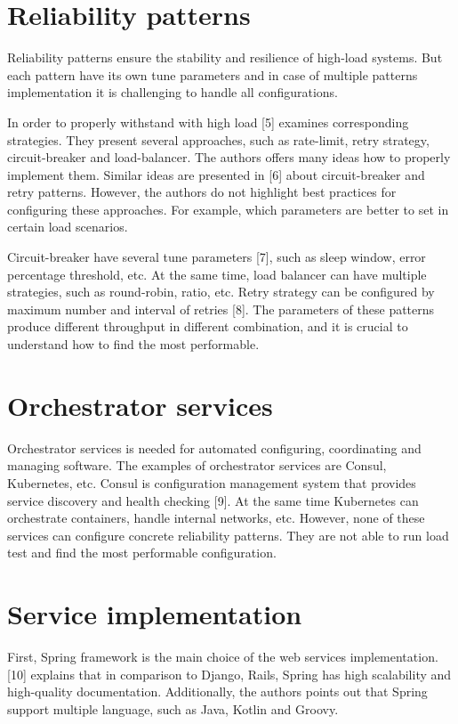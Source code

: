 \section{Reliability patterns}\label{sec:reliablity}

Reliability patterns ensure the stability and resilience of high-load systems.
But each pattern have its own tune parameters and in case of multiple patterns implementation it is challenging to handle all configurations.

In order to properly withstand with high load [5] examines corresponding strategies.
They present several approaches, such as rate-limit, retry strategy, circuit-breaker and load-balancer.
The authors offers many ideas how to properly implement them.
Similar ideas are presented in [6] about circuit-breaker and retry patterns.
However, the authors do not highlight best practices for configuring these approaches.
For example, which parameters are better to set in certain load scenarios.

Circuit-breaker have several tune parameters [7], such as sleep window, error percentage threshold, etc.
At the same time, load balancer can have multiple strategies, such as round-robin, ratio, etc.
Retry strategy can be configured by maximum number and interval of retries [8].
The parameters of these patterns produce different throughput in different combination, and it is crucial to understand how to find the most performable.


\section{Orchestrator services}\label{sec:service-orchestrator}
Orchestrator services is needed for automated configuring, coordinating and managing software.
The examples of orchestrator services are Consul, Kubernetes, etc.
Consul is configuration management system that provides service discovery and health checking [9].
At the same time Kubernetes can orchestrate containers, handle internal networks, etc.
However, none of these services can configure concrete reliability patterns.
They are not able to run load test and find the most performable configuration.


\section{Service implementation}\label{sec:implementation}
First, Spring framework is the main choice of the web services implementation.
[10] explains that in comparison to Django, Rails, Spring has high scalability and high-quality documentation.
Additionally, the authors points out that Spring support multiple language, such as Java, Kotlin and Groovy.

